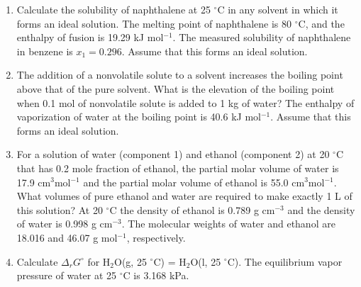 \begin{enumerate}

\item Calculate the solubility of naphthalene at 25 $^\circ$C in any solvent in which it forms an ideal solution. The melting point of naphthalene is 80 $^\circ$C, and the enthalpy of fusion is 19.29 kJ mol$^{-1}$. The measured solubility of naphthalene in benzene is $x_1 = 0.296$. Assume that this forms an ideal solution.


\item The addition of a nonvolatile solute to a solvent increases the boiling point above that of the pure solvent. What is the elevation of the boiling point when 0.1 mol of nonvolatile solute is added to 1 kg of water? The enthalpy of vaporization of water at the boiling point is 40.6 kJ mol$^{-1}$. Assume that this forms an ideal solution.


\item For a solution of water (component 1) and ethanol (component 2) at 20 $^\circ$C that has 0.2 mole fraction of ethanol, the partial molar volume of water is 17.9 cm$^{3}$mol$^{-1}$ and the partial molar volume of ethanol is 55.0 cm$^3$mol$^{-1}$. What volumes of pure ethanol and water are required to make exactly 1 L of this solution? At 20 $^\circ$C the density of ethanol is 0.789 g cm$^{-3}$ and the density of water is 0.998 g cm$^{-3}$. The molecular weights of water and ethanol are 18.016 and 46.07 g mol$^{-1}$, respectively.


\item Calculate $\Delta_rG^\circ$ for H$_2$O(g, 25 $^\circ$C) = H$_2$O(l, 25 $^\circ$C). The equilibrium vapor pressure of water at 25 $^\circ$C is 3.168 kPa.


\end{enumerate}
